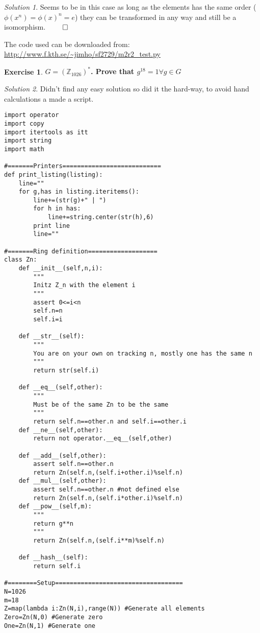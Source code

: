 \documentclass[a4paper,twoside=false,abstract=false,numbers=noenddot,
titlepage=false,headings=small,parskip=half,version=last]{scrartcl}
\theoremstyle{definition}
\newtheorem{exercise}{Exercise}
\theoremstyle{remark}
\newtheorem*{solution}{Solution}
\newcommand{\ZZ}{\ensuremath{\mathbb{Z}}}
\begin{document}
\begin{solution}
Seems to be in this case as long as the elements has the same order ($\phi(x^n)=\phi(x)^n=e$) they can be transformed in any way and still be a isomorphism. $\qed$

The code used can be downloaded from:\\
\url{http://www.f.kth.se/~jimho/sf2729/m2r2_test.py}
\end{solution}

\begin{exercise}
{\bf
$G=(\ZZ_{1026})^*$. Prove that $g^{18}=1 \forall g \in G$
}
\end{exercise}
\begin{solution}

Didn't find any easy solution so did it the hard-way, to avoid hand
calculations a made a script.
\begin{verbatim}
import operator
import copy
import itertools as itt
import string
import math

#=======Printers===========================
def print_listing(listing):
    line=""
    for g,has in listing.iteritems():
        line+=(str(g)+" | ")
        for h in has:
            line+=string.center(str(h),6)
        print line
        line=""

#=======Ring definition===================
class Zn:
    def __init__(self,n,i):
        """
        Initz Z_n with the element i
        """
        assert 0<=i<n
        self.n=n
        self.i=i

    def __str__(self):
        """
        You are on your own on tracking n, mostly one has the same n
        """
        return str(self.i)

    def __eq__(self,other):
        """
        Must be of the same Zn to be the same
        """
        return self.n==other.n and self.i==other.i
    def __ne__(self,other):
        return not operator.__eq__(self,other)
    
    def __add__(self,other):
        assert self.n==other.n
        return Zn(self.n,(self.i+other.i)%self.n)
    def __mul__(self,other):
        assert self.n==other.n #not defined else
        return Zn(self.n,(self.i*other.i)%self.n)
    def __pow__(self,m):
        """
        return g**n
        """
        return Zn(self.n,(self.i**m)%self.n)
    
    def __hash__(self):
        return self.i

#========Setup===================================
N=1026
m=18
Z=map(lambda i:Zn(N,i),range(N)) #Generate all elements
Zero=Zn(N,0) #Generate zero
One=Zn(N,1) #Generate one


\end{verbatim}
\end{solution}
\end{document}
